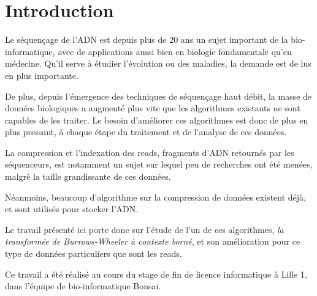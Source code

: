 \section*{Introduction} %

Le séquençage de l'ADN est depuis plus de 20 ans un sujet important de la bio-informatique, avec de applications aussi bien en biologie fondamentale qu'en médecine. Qu'il serve à étudier l'évolution ou des maladies, la demande est de lus en plus importante.

De plus, depuis l'émergence des techniques de séquençage haut débit, la masse de données biologiques a augmenté plus vite que les algorithmes existants ne sont capables de les traiter. Le besoin d'améliorer ces algorithmes est donc de plus en plus pressant, à chaque étape du traitement et de l'analyse de ces données.

La compression et l'indexation des reads, fragments d'ADN retournés par les séquenceurs, est notamment un sujet sur lequel peu de recherches ont été menées, malgré la taille grandissante de ces données.

Néanmoins, beaucoup d'algorithme sur la compression de données existent déjà, et sont utilisés pour stocker l'ADN.

Le travail présenté ici porte donc sur l'étude de l'un de ces algorithmes, \textit{la transformée de Burrows-Wheeler à contexte borné}, et son amélioration pour ce type de données particuliers que sont les reads.

Ce travail a été réalisé au cours du stage de fin de licence informatique à Lille 1, dans l'équipe de bio-informatique Bonsai.





